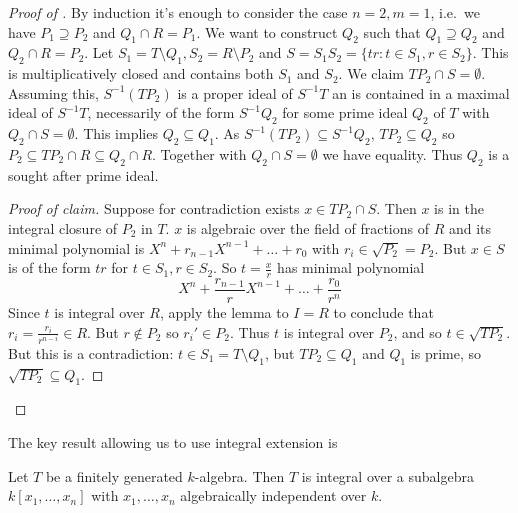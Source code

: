 \documentclass[a4paper]{article}
\begin{document}
\begin{proof}[Proof of ]
  By induction it's enough to consider the case \(n = 2, m = 1\), i.e.\ we have \(P_1 \supseteq P_2\) and \(Q_1 \cap R = P_1\). We want to construct \(Q_2\) such that \(Q_1 \supseteq Q_2\) and \(Q_2 \cap R = P_2\). Let \(S_1 = T \setminus Q_1, S_2 = R \setminus P_2\) and \(S = S_1S_2 = \{tr: t \in S_1, r \in S_2\}\). This is multiplicatively closed and contains both \(S_1\) and \(S_2\). We claim \(TP_2 \cap S = \emptyset\). Assuming this, \(S^{-1}(TP_2)\) is a proper ideal of \(S^{-1}T\) an is contained in a maximal ideal of \(S^{-1}T\), necessarily of the form \(S^{-1}Q_2\) for some prime ideal \(Q_2\) of \(T\) with \(Q_2 \cap S = \emptyset\). This implies \(Q_2 \subseteq Q_1\). As \(S^{-1}(TP_2) \subseteq S^{-1}Q_2\), \(TP_2 \subseteq Q_2\) so \(P_2 \subseteq TP_2 \cap R \subseteq Q_2 \cap R\). Together with \(Q_2 \cap S = \emptyset\) we have equality. Thus \(Q_2\) is a sought after prime ideal.

  \begin{proof}[Proof of claim]
    Suppose for contradiction exists \(x \in TP_2 \cap S\). Then \(x\) is in the integral closure of \(P_2\) in \(T\). \(x\) is algebraic over the field of fractions of \(R\) and its minimal polynomial is \(X^n + r_{n - 1} X^{n - 1} + \dots + r_0\) with \(r_i \in \sqrt{P_2} = P_2\). But \(x \in S\) is of the form \(tr\) for \(t \in S_1, r \in S_2\). So \(t = \frac{x}{r}\) has minimal polynomial
    \[
      X^n + \frac{r_{n -1}}{r} X^{n - 1} + \dots + \frac{r_0}{r^n}
    \]
    Since \(t\) is integral over \(R\), apply the lemma to \(I = R\) to conclude that \(r_i = \frac{r_i}{r^{n - i}} \in R\). But \(r \notin P_2\) so \(r_i' \in P_2\). Thus \(t\) is integral over \(P_2\), and so \(t \in \sqrt{TP_2}\). But this is a contradiction: \(t \in S_1 = T \setminus Q_1\), but \(TP_2 \subseteq Q_1\) and \(Q_1\) is prime, so \(\sqrt{TP_2} \subseteq Q_1\).
  \end{proof}
\end{proof}

The key result allowing us to use integral extension is

\begin{lemma}
  Let \(T\) be a finitely generated \(k\)-algebra. Then \(T\) is integral over a subalgebra \(k[x_1, \dots, x_n]\) with \(x_1, \dots, x_n\) algebraically independent over \(k\).
\end{lemma}
\end{document}
